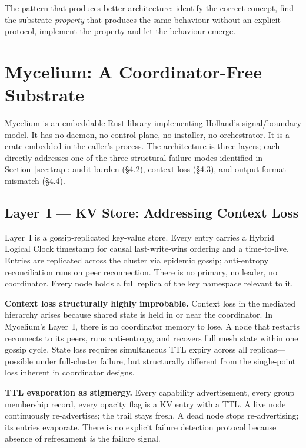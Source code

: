 \documentclass[11pt]{article}
\begin{document}
The pattern that produces better architecture: identify the correct concept, find
the substrate \emph{property} that produces the same behaviour without an explicit
protocol, implement the property and let the behaviour emerge.

\section{Mycelium: A Coordinator-Free Substrate}
\label{sec:mycelium}

Mycelium is an embeddable Rust library implementing Holland's signal/boundary
model. It has no daemon, no control plane, no installer, no orchestrator. It is a
crate embedded in the caller's process. The architecture is three layers; each directly addresses one of the three
structural failure modes identified in Section~\ref{sec:trap}: audit burden
(\S4.2), context loss (\S4.3), and output format mismatch (\S4.4).

\subsection{Layer~I --- KV Store: Addressing Context Loss}

Layer~I is a gossip-replicated key-value store. Every entry carries a Hybrid
Logical Clock timestamp for causal last-write-wins ordering and a time-to-live.
Entries are replicated across the cluster via epidemic gossip; anti-entropy
reconciliation runs on peer reconnection. There is no primary, no leader, no
coordinator. Every node holds a full replica of the key namespace relevant to it.

\textbf{Context loss structurally highly improbable.} Context loss in the mediated
hierarchy arises because shared state is held in or near the coordinator. In
Mycelium's Layer~I, there is no coordinator memory to lose. A node that restarts
reconnects to its peers, runs anti-entropy, and recovers full mesh state within
one gossip cycle. State loss requires simultaneous TTL expiry across all
replicas---possible under full-cluster failure, but structurally different from
the single-point loss inherent in coordinator designs.

\textbf{TTL evaporation as stigmergy.} Every capability advertisement, every group
membership record, every opacity flag is a KV entry with a TTL. A live node
continuously re-advertises; the trail stays fresh. A dead node stops
re-advertising; its entries evaporate. There is no explicit failure detection
protocol because absence of refreshment \emph{is} the failure signal.
\end{document}
